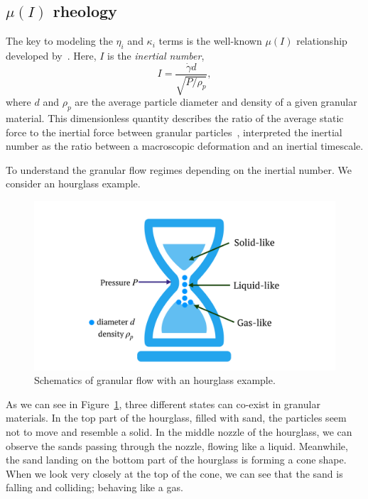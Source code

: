 \subsection{$\mu (I)$ rheology}
The key to modeling the $\eta_i$ and $\kappa_i$ terms is the well-known $\mu(I)$ relationship developed by~\cite{jop_constitutive_2006}.
Here, $I$ is the \textit{inertial number},
\begin{equation}
  I =  \frac{\dot{\gamma} d }{\sqrt{P/\rho_p}},
  \label{eq_inertialI}
\end{equation}
where $d$ and $\rho_p$ are the average particle diameter and density of a given granular material.
This dimensionless quantity describes the ratio of the average static force to the inertial force between granular particles~\cite{jop_constitutive_2006}, interpreted the inertial number as the ratio between a macroscopic deformation and an inertial timescale. 
\par
To understand the granular flow regimes depending on the inertial number. We consider an hourglass example. 
\begin{figure}[ht]
  \begin{center}
    \includegraphics[scale=0.15]{figures/fig_hourglass.pdf}
    \end{center}
  \caption{Schematics of granular flow with an hourglass example.}
  \label{fig_hourglass}
\end{figure}
As we can see in Figure~\ref{fig_hourglass}, three different states can co-exist in granular materials. 
In the top part of the hourglass, filled with sand, the particles seem not to move and resemble a solid. 
In the middle nozzle of the hourglass, we can observe the sands passing through the nozzle, flowing like a liquid.
Meanwhile, the sand landing on the bottom part of the hourglass is forming a cone shape. When we look very closely at the top of the cone, we can see that the sand is falling and colliding; behaving like a gas.
